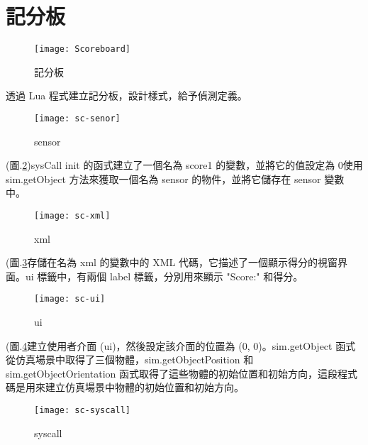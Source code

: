\section{記分板}
\begin{figure}[hbt!]
\begin{center}
\texttt{[image: Scoreboard]}
\caption{\Large 記分板}\label{Scoreboard}
\end{center}
\end{figure}
透過 Lua 程式建立記分板，設計樣式，給予偵測定義。\\
\newpage
\begin{figure}[hbt!]
\begin{center}
\texttt{[image: sc-senor]}
\caption{\Large sensor}\label{sc-senor}
\end{center}
\end{figure}

(圖.\ref{sc-senor})sysCall init 的函式建立了一個名為 score1 的變數，並將它的值設定為 0使用 sim.getObject 方法來獲取一個名為 sensor 的物件，並將它儲存在 sensor 變數中。\\
\begin{figure}[hbt!]
\begin{center}
\texttt{[image: sc-xml]}
\caption{\Large xml}\label{sc-xml}
\end{center}
\end{figure}

(圖.\ref{sc-xml}存儲在名為 xml 的變數中的 XML 代碼，它描述了一個顯示得分的視窗界面。ui 標籤中，有兩個 label 標籤，分別用來顯示 "Score:" 和得分。\\
\begin{figure}[hbt!]
\begin{center}
\texttt{[image: sc-ui]}
\caption{\Large ui}\label{sc-ui}
\end{center}
\end{figure}

\newpage
(圖.\ref{sc-ui}建立使用者介面 (ui)，然後設定該介面的位置為 (0, 0)。sim.getObject 函式從仿真場景中取得了三個物體，sim.getObjectPosition 和 sim.getObjectOrientation 函式取得了這些物體的初始位置和初始方向，這段程式碼是用來建立仿真場景中物體的初始位置和初始方向。\\
\begin{figure}[hbt!]
\begin{center}
\texttt{[image: sc-syscall]}
\caption{\Large syscall}\label{sc-syscall}
\end{center}
\end{figure}

